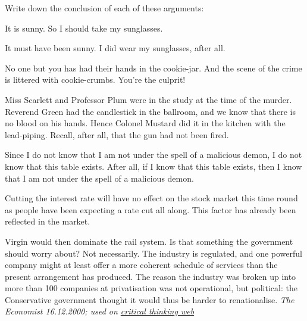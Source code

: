 \begin{practiceproblems}
\problempart
Write down the conclusion of each of these arguments:
\begin{problemslist}
	\item It is sunny. So I should take my sunglasses.
	\item It must have been sunny. I did wear my sunglasses, after all.
	\item No one but you has had their hands in the cookie-jar. And the scene of the crime is littered with cookie-crumbs. You're the culprit!
	\item Miss Scarlett and Professor Plum were in the study at the time of the murder. Reverend Green had the candlestick in the ballroom, and we know that there is no blood on his hands. Hence Colonel Mustard did it in the kitchen with the lead-piping. Recall, after all, that the gun had not been fired.
	\item  Since I do not know that I am not under the spell of a malicious demon, I do not know that this table exists. After all, if I know that this table exists, then I know that I am not under the spell of a malicious demon.
	\item Cutting the interest rate will have no effect on the stock market this time round as people have been expecting a rate cut all along. This factor has already been reflected in the market.
	\item Virgin would then dominate the rail system. Is that something the government should worry about? Not necessarily. The industry is regulated, and one powerful company might at least offer a more coherent schedule of services than the present arrangement has produced. The reason the industry was broken up into more than 100 companies at privatisation was not operational, but political: the Conservative government thought it would thus be harder to renationalise. \emph{The Economist 16.12.2000; used on \href{https://philosophy.hku.hk/think/arg/arg.php}{critical thinking web}}

\end{problemslist}
\end{practiceproblems}

